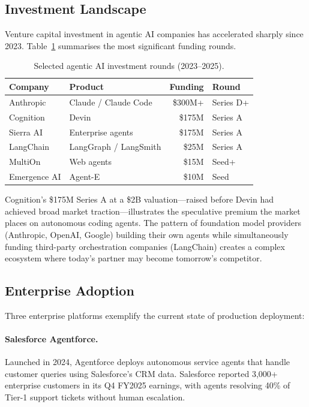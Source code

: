 \documentclass[12pt, a4paper]{article}
\begin{document}
\subsection{Investment Landscape}
Venture capital investment in agentic AI companies has accelerated sharply since 2023. Table~\ref{tab:investment} summarises the most significant funding rounds.

\begin{table}[ht]
\centering
\caption{Selected agentic AI investment rounds (2023--2025).}
\label{tab:investment}
\begin{tabular}{llrl}
\toprule
\textbf{Company} & \textbf{Product} & \textbf{Funding} & \textbf{Round} \\
\midrule
Anthropic     & Claude / Claude Code  & \$300M+   & Series D+ \\
Cognition     & Devin                 & \$175M    & Series A \\
Sierra AI     & Enterprise agents     & \$175M    & Series A \\
LangChain     & LangGraph / LangSmith & \$25M     & Series A \\
MultiOn       & Web agents            & \$15M     & Seed+ \\
Emergence AI  & Agent-E               & \$10M     & Seed \\
\bottomrule
\end{tabular}
\end{table}

Cognition's \$175M Series A at a \$2B valuation---raised before Devin had achieved broad market traction---illustrates the speculative premium the market places on autonomous coding agents. The pattern of foundation model providers (Anthropic, OpenAI, Google) building their own agents while simultaneously funding third-party orchestration companies (LangChain) creates a complex ecosystem where today's partner may become tomorrow's competitor.

\subsection{Enterprise Adoption}
Three enterprise platforms exemplify the current state of production deployment:

\paragraph{Salesforce Agentforce.} Launched in 2024, Agentforce deploys autonomous service agents that handle customer queries using Salesforce's CRM data. Salesforce reported 3,000+ enterprise customers in its Q4 FY2025 earnings, with agents resolving 40\% of Tier-1 support tickets without human escalation.
\end{document}
